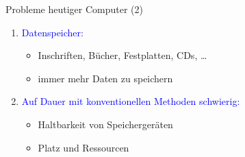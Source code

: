 \documentclass{beamer}
\begin{document}
\begin{frame}{Probleme heutiger Computer (2)}
	\begin{enumerate}
	
	\item \textcolor{blue}{Datenspeicher:}
	\begin{itemize}
		\item 	Inschriften, Bücher, Festplatten, CDs, …
		\item immer mehr Daten zu speichern
	\end{itemize}
\pause
	\item \textcolor{blue}{Auf Dauer mit konventionellen Methoden schwierig:}
	\begin{itemize}
		\item 	Haltbarkeit von Speichergeräten
		\item Platz und Ressourcen
		
	\end{itemize}

	\end{enumerate}
\end{frame}
\end{document}

